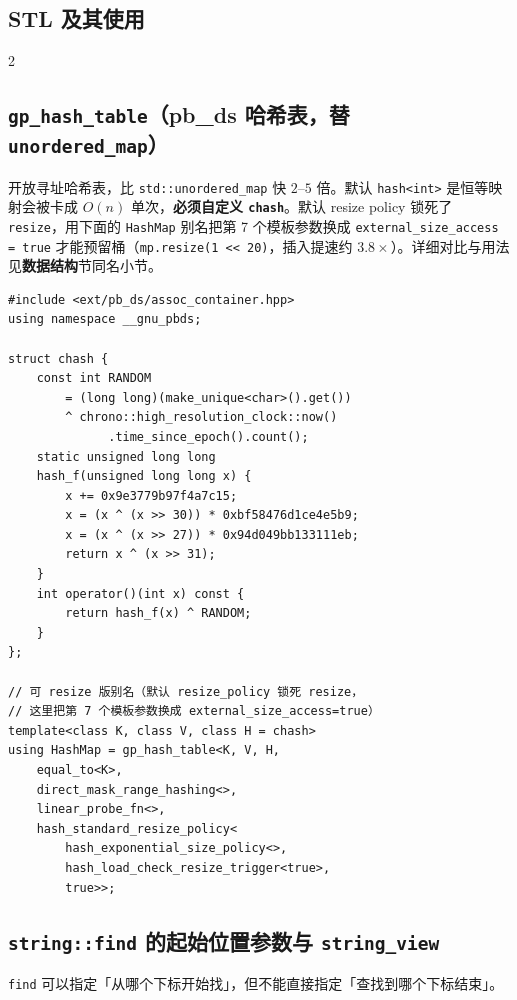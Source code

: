 	\begin{center}
		\section{STL 及其使用}
	\end{center}

	\begin{multicols*}{2}

		\subsection{\texttt{gp\_hash\_table}（pb\_ds 哈希表，替 \texttt{unordered\_map}）}

		开放寻址哈希表，比 \verb|std::unordered_map| 快 $2$--$5$ 倍。默认 \verb|hash<int>| 是恒等映射会被卡成 $O(n)$ 单次，\textbf{必须自定义 \texttt{chash}}。默认 resize policy 锁死了 \verb|resize|，用下面的 \verb|HashMap| 别名把第 7 个模板参数换成 \verb|external_size_access = true| 才能预留桶（\verb|mp.resize(1 << 20)|，插入提速约 $3.8\times$）。详细对比与用法见\textbf{数据结构}节同名小节。

		\begin{verbatim}
#include <ext/pb_ds/assoc_container.hpp>
using namespace __gnu_pbds;

struct chash {
    const int RANDOM
        = (long long)(make_unique<char>().get())
        ^ chrono::high_resolution_clock::now()
              .time_since_epoch().count();
    static unsigned long long
    hash_f(unsigned long long x) {
        x += 0x9e3779b97f4a7c15;
        x = (x ^ (x >> 30)) * 0xbf58476d1ce4e5b9;
        x = (x ^ (x >> 27)) * 0x94d049bb133111eb;
        return x ^ (x >> 31);
    }
    int operator()(int x) const {
        return hash_f(x) ^ RANDOM;
    }
};

// 可 resize 版别名（默认 resize_policy 锁死 resize，
// 这里把第 7 个模板参数换成 external_size_access=true）
template<class K, class V, class H = chash>
using HashMap = gp_hash_table<K, V, H,
    equal_to<K>,
    direct_mask_range_hashing<>,
    linear_probe_fn<>,
    hash_standard_resize_policy<
        hash_exponential_size_policy<>,
        hash_load_check_resize_trigger<true>,
        true>>;
		\end{verbatim}

		\subsection{\texttt{string::find} 的起始位置参数与 \texttt{string\_view}}
		\texttt{find} 可以指定「从哪个下标开始找」，但不能直接指定「查找到哪个下标结束」。


\end{multicols*}
